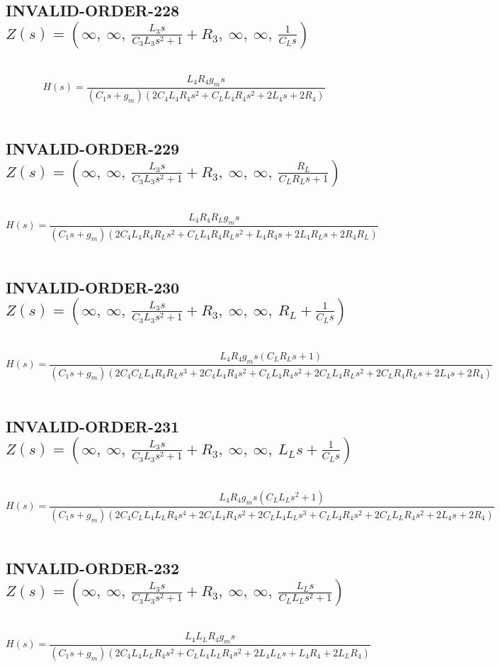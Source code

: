 \documentclass{article}
\begin{document}
\subsection{INVALID-ORDER-228 $Z(s) = \left( \infty, \  \infty, \  \frac{L_{3} s}{C_{3} L_{3} s^{2} + 1} + R_{3}, \  \infty, \  \infty, \  \frac{1}{C_{L} s}\right)$ } \ 
\textbf{\[H(s) = \frac{L_{4} R_{4} g_{m} s}{\left(C_{1} s + g_{m}\right) \left(2 C_{4} L_{4} R_{4} s^{2} + C_{L} L_{4} R_{4} s^{2} + 2 L_{4} s + 2 R_{4}\right)}\] } \ 
\subsection{INVALID-ORDER-229 $Z(s) = \left( \infty, \  \infty, \  \frac{L_{3} s}{C_{3} L_{3} s^{2} + 1} + R_{3}, \  \infty, \  \infty, \  \frac{R_{L}}{C_{L} R_{L} s + 1}\right)$ } \ 
\textbf{\[H(s) = \frac{L_{4} R_{4} R_{L} g_{m} s}{\left(C_{1} s + g_{m}\right) \left(2 C_{4} L_{4} R_{4} R_{L} s^{2} + C_{L} L_{4} R_{4} R_{L} s^{2} + L_{4} R_{4} s + 2 L_{4} R_{L} s + 2 R_{4} R_{L}\right)}\] } \ 
\subsection{INVALID-ORDER-230 $Z(s) = \left( \infty, \  \infty, \  \frac{L_{3} s}{C_{3} L_{3} s^{2} + 1} + R_{3}, \  \infty, \  \infty, \  R_{L} + \frac{1}{C_{L} s}\right)$ } \ 
\textbf{\[H(s) = \frac{L_{4} R_{4} g_{m} s \left(C_{L} R_{L} s + 1\right)}{\left(C_{1} s + g_{m}\right) \left(2 C_{4} C_{L} L_{4} R_{4} R_{L} s^{3} + 2 C_{4} L_{4} R_{4} s^{2} + C_{L} L_{4} R_{4} s^{2} + 2 C_{L} L_{4} R_{L} s^{2} + 2 C_{L} R_{4} R_{L} s + 2 L_{4} s + 2 R_{4}\right)}\] } \ 
\subsection{INVALID-ORDER-231 $Z(s) = \left( \infty, \  \infty, \  \frac{L_{3} s}{C_{3} L_{3} s^{2} + 1} + R_{3}, \  \infty, \  \infty, \  L_{L} s + \frac{1}{C_{L} s}\right)$ } \ 
\textbf{\[H(s) = \frac{L_{4} R_{4} g_{m} s \left(C_{L} L_{L} s^{2} + 1\right)}{\left(C_{1} s + g_{m}\right) \left(2 C_{4} C_{L} L_{4} L_{L} R_{4} s^{4} + 2 C_{4} L_{4} R_{4} s^{2} + 2 C_{L} L_{4} L_{L} s^{3} + C_{L} L_{4} R_{4} s^{2} + 2 C_{L} L_{L} R_{4} s^{2} + 2 L_{4} s + 2 R_{4}\right)}\] } \ 
\subsection{INVALID-ORDER-232 $Z(s) = \left( \infty, \  \infty, \  \frac{L_{3} s}{C_{3} L_{3} s^{2} + 1} + R_{3}, \  \infty, \  \infty, \  \frac{L_{L} s}{C_{L} L_{L} s^{2} + 1}\right)$ } \ 
\textbf{\[H(s) = \frac{L_{4} L_{L} R_{4} g_{m} s}{\left(C_{1} s + g_{m}\right) \left(2 C_{4} L_{4} L_{L} R_{4} s^{2} + C_{L} L_{4} L_{L} R_{4} s^{2} + 2 L_{4} L_{L} s + L_{4} R_{4} + 2 L_{L} R_{4}\right)}\] } \ 
\end{document}
